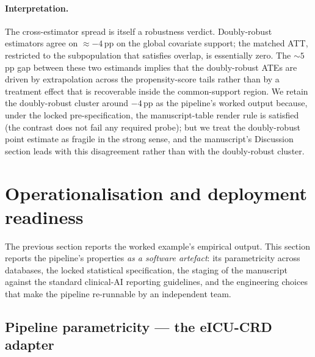 \documentclass[11pt,a4paper]{article}
\begin{document}
\paragraph{Interpretation.} The cross-estimator spread is itself a robustness verdict. Doubly-robust estimators agree on $\approx -4$\,pp on the global covariate support; the matched ATT, restricted to the subpopulation that satisfies overlap, is essentially zero. The $\sim 5$\,pp gap between these two estimands implies that the doubly-robust ATEs are driven by extrapolation across the propensity-score tails rather than by a treatment effect that is recoverable inside the common-support region. We retain the doubly-robust cluster around $-4$\,pp as the pipeline's worked output because, under the locked pre-specification, the manuscript-table render rule is satisfied (the contrast does not fail any required probe); but we treat the doubly-robust point estimate as fragile in the strong sense, and the manuscript's Discussion section leads with this disagreement rather than with the doubly-robust cluster.

\section{Operationalisation and deployment readiness}\label{sec:operationalisation}

The previous section reports the worked example's empirical output. This section reports the pipeline's properties \emph{as a software artefact}: its parametricity across databases, the locked statistical specification, the staging of the manuscript against the standard clinical-AI reporting guidelines, and the engineering choices that make the pipeline re-runnable by an independent team.

\subsection{Pipeline parametricity --- the eICU-CRD adapter}
\label{sec:eicu}
\end{document}
